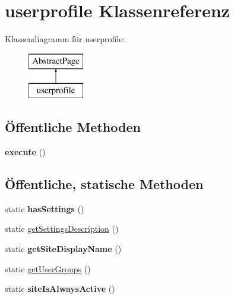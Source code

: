 \hypertarget{classuserprofile}{}\section{userprofile Klassenreferenz}
\label{classuserprofile}
Klassendiagramm für userprofile\+:\begin{figure}[H]
\begin{center}
\leavevmode
\includegraphics[height=2.000000cm]{classuserprofile}
\end{center}
\end{figure}
\subsection*{Öffentliche Methoden}
\begin{DoxyCompactItemize}
\item 
\mbox{\label{classuserprofile_af05dd93da374cb76ee95ef5b60c285aa}} 
{\bfseries execute} ()
\end{DoxyCompactItemize}
\subsection*{Öffentliche, statische Methoden}
\begin{DoxyCompactItemize}
\item 
\mbox{\label{classuserprofile_a87ddf9f4176cdeef9bff4e3e28847b8b}} 
static {\bfseries has\+Settings} ()
\item 
static \mbox{\hyperlink{classuserprofile_a7f7df46f299bdd7f223e0a38d262e06d}{get\+Settings\+Description}} ()
\item 
\mbox{\label{classuserprofile_a83870c2823abb2be9137c71e7d91718f}} 
static {\bfseries get\+Site\+Display\+Name} ()
\item 
static \mbox{\hyperlink{classuserprofile_aad8cc7ff45937e8bc4f05799fcfa8c95}{get\+User\+Groups}} ()
\item 
\mbox{\label{classuserprofile_a73fb72caaf5473a2794c63b2418deb66}} 
static {\bfseries site\+Is\+Always\+Active} ()
\end{DoxyCompactItemize}
